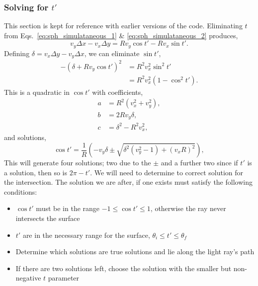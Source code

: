 \documentclass{article}
\begin{document}
\subsubsection{Solving for $t'$}
This section is kept for reference with earlier versions of the code. Eliminating $t$ from Eqs.~\ref{eq:sph_simulataneous_1} \& \ref{eq:sph_simulataneous_2} produces,
\begin{equation}
    v_y \Delta x - v_x \Delta y
    =
    R v_y \cos t'
    -
    R v_x \sin t'.
\end{equation}
Defining $\delta= v_x \Delta y - v_y \Delta x$, we can eliminate $\sin t'$,
\begin{align}
    -\left(
        \delta + R v_y \cos t'
    \right)^2
    &=
    R^2 v_x^2 \sin^2 t' \\
    &=
    R^2 v_x^2 (1 - \cos^2 t').
\end{align}
This is a quadratic in $\cos t'$ with coefficients,
\begin{align}
    a
    &=
    R^2 \left( v_x^2 + v_y^2 \right), \\
    b
    &=
    2 R v_y \delta, \\
    c
    &=
    \delta^2 - R^2 v_x^2,
\end{align}
and solutions,
\begin{equation}
    \cos t'
    =
    \frac{1}{R}
    \left(
        -v_y
        \delta
        \pm
        \sqrt{
         \delta^2 
        \left(
            v_y^2 - 1
        \right)
        +
        \left(
            v_x R
        \right)^2
        }
    \right),
\end{equation}
This will generate four solutions; two due to the $\pm$ and a further two since if $t'$ is a solution, then so is $2\pi - t'$. We will need to determine to correct solution for the intersection. The solution we are after, if one exists must satisfy the following conditions:
\begin{itemize}
    \item $\cos t'$ must be in the range $-1 \le \cos t' \le 1$, otherwise the ray never intersects the surface
    \item $t'$ are in the necessary range for the surface, $\theta_i \le t' \le \theta_f$
    \item Determine which solutions are true solutions and lie along the light ray's path
    \item If there are two solutions left, choose the solution with the smaller but non-negative $t$ parameter
\end{itemize}
\end{document}
